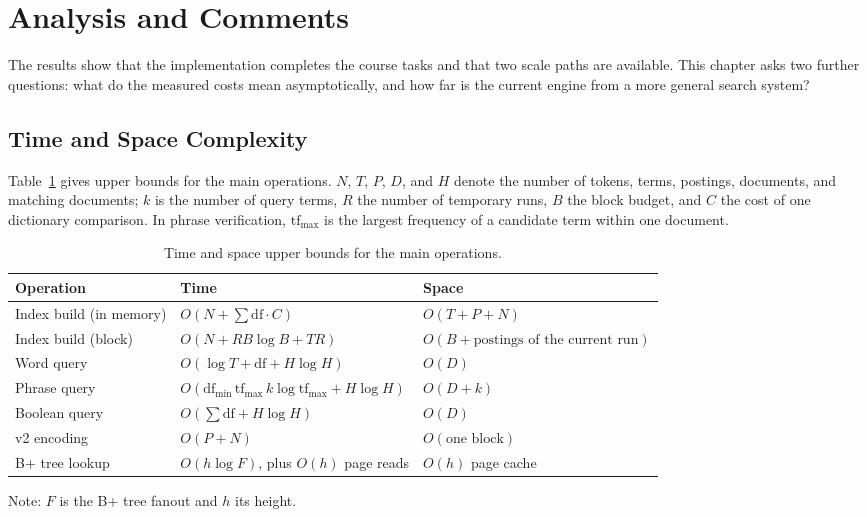 
\newpage
\section{Analysis and Comments}
\label{sec:analysis}

The results show that the implementation completes the course tasks and that
two scale paths are available. This chapter asks two further questions: what do
the measured costs mean asymptotically, and how far is the current engine from
a more general search system?

\subsection{Time and Space Complexity}
\label{sec:complexity}

Table~\ref{tab:complexity} gives upper bounds for the main operations. $N$,
$T$, $P$, $D$, and $H$ denote the number of tokens, terms, postings,
documents, and matching documents; $k$ is the number of query terms, $R$ the
number of temporary runs, $B$ the block budget, and $C$ the cost of one
dictionary comparison. In phrase verification, $\mathrm{tf}_{\max}$ is the
largest frequency of a candidate term within one document.

\begin{table}[!htbp]
  \centering
  \caption{Time and space upper bounds for the main operations.}
  \label{tab:complexity}
  \small
  \begin{tabular}{l l l}
    \toprule
    Operation & Time & Space \\
    \midrule
    Index build (in memory) & $O(N+\sum \mathrm{df}\cdot C)$ & $O(T+P+N)$ \\
    Index build (block) & $O(N+RB\log B+TR)$ &
      $O(B+\text{postings of the current run})$ \\
    Word query & $O(\log T+\mathrm{df}+H\log H)$ & $O(D)$ \\
    Phrase query &
      $O(\mathrm{df}_{\min}\,\mathrm{tf}_{\max}\,k\log\mathrm{tf}_{\max}+H\log H)$ &
      $O(D+k)$ \\
    Boolean query & $O(\sum \mathrm{df}+H\log H)$ & $O(D)$ \\
    v2 encoding & $O(P+N)$ & $O(\text{one block})$ \\
    B+ tree lookup & $O(h\log F)$, plus $O(h)$ page reads & $O(h)$ page cache \\
    \bottomrule
  \end{tabular}
  \par\smallskip
  \footnotesize Note: $F$ is the B+ tree fanout and $h$ its height.
\end{table}

